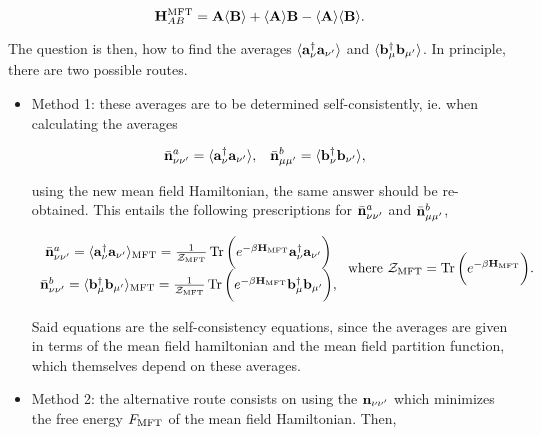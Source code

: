 \documentclass{homework}
\begin{document}
$$
    {\bf H}_{AB}^{\textnormal{MFT}} = {\bf A} \langle{\bf B}\rangle + \langle{\bf A} \rangle{{\bf B}} - \langle{\bf A} \rangle\langle{\bf B} \rangle.
$$

The question is then, how to find the averages $\langle {\bf a}_{\nu}^\dagger {\bf a}_{\nu'} \rangle$ and $\langle {\bf b}_{\mu}^\dagger {\bf b}_{\mu'} \rangle$. In principle, there are two possible routes. 

\begin{itemize}
    \item Method 1: these averages are to be determined self-consistently, ie. when calculating the averages 
    
    \begin{align}
        \bar{{\bf n}}_{\nu \nu'}^{a} &= \langle {\bf a}_{\nu}^\dagger {\bf a}_{\nu'} \rangle, & \bar{{\bf n}}_{\mu \mu'}^{b} &= \langle {\bf b}_{\nu}^\dagger {\bf b}_{\nu'} \rangle,
    \end{align}
    
    using the new mean field Hamiltonian, the same answer should be re-obtained. This entails the following prescriptions for $\bar{{\bf n}}_{\nu \nu'}^{a}$ and $\bar{{\bf n}}_{\mu \mu'}^{b}$,
    
     \begin{align} 
     \begin{array}{c}
        \bar{{\bf n}}_{\nu \nu'}^{a} = \langle {\bf a}_{\nu}^\dagger {\bf a}_{\nu'} \rangle_{\textnormal{MFT}} = \frac{1}{\mathcal{Z}_{\textnormal{MFT}}} \Tr \bigg(e^{-\beta {\bf H}_{\textnormal{MFT}}} {\bf a}_{\nu}^\dagger {\bf a}_{\nu'}\bigg) \\ \bar{{\bf n}}_{\nu \nu'}^{b} = \langle {\bf b}_{\mu}^\dagger {\bf b}_{\mu'} \rangle_{\textnormal{MFT}} = \frac{1}{\mathcal{Z}_{\textnormal{MFT}}} \Tr \bigg(e^{-\beta {\bf H}_{\textnormal{MFT}}} {\bf b}_{\mu}^\dagger {\bf b}_{\mu'}\bigg),
     \end{array} \textnormal{ where } 
             \mathcal{Z}_{\textnormal{MFT}} = \Tr \bigg(e^{-\beta {\bf H}_{\textnormal{MFT}}}\bigg).
    \end{align}
    
    Said equations are the self-consistency equations, since the averages are given in terms of the mean field hamiltonian and the mean field partition function, which themselves depend on these averages. \\
    
    \item Method 2: the alternative route consists on using the ${\bf n}_{\nu \nu'}$ which minimizes the free energy $F_{\textnormal{MFT}}$ of the mean field Hamiltonian. Then, 
    

\end{itemize}
\end{document}
